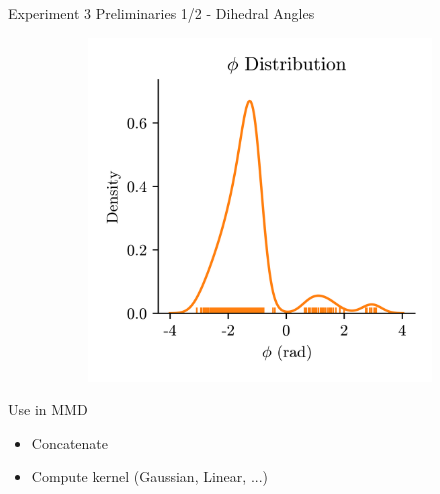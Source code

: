 \documentclass[aspectratio=169, 10pt, dvipsnames]{beamer}
\begin{document}
{\begin{frame}[fragile]{Experiment 3 Preliminaries 1/2 - Dihedral Angles}
\begin{minipage}{0.3\textwidth}
\begin{adjustbox}{minipage=\linewidth,scale=0.8}
\begin{figure}
\begin{subfigure}{\textwidth}
          \end{subfigure}
          \begin{subfigure}{\textwidth}
            \includegraphics[width=\textwidth]{./figures/dehedral_dist_phi.png}
          \end{subfigure}
        \end{figure}
      \end{adjustbox}
    \end{minipage}
    \pause\begin{minipage}{0.28\textwidth}
      \begin{alert}{Use in MMD}
        \begin{itemize}
        \item\small Concatenate
        \item\small Compute kernel (Gaussian, Linear, ...)
        \end{itemize}

      \end{alert}
    \end{minipage}
  \end{frame}
}
\end{document}
